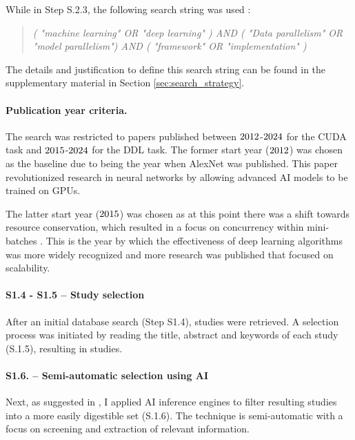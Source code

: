 While in Step S.2.3, the following search string was used :
\begin{quote}
	\textit{( "machine learning" OR "deep learning" )
		AND
		( "Data parallelism" OR "model parallelism")
		AND
		( "framework" OR "implementation" )}
\end{quote}

The details and justification to define this search string can be found in the supplementary
material in Section \ref{sec:search_strategy}.

\paragraph{Publication year criteria.}
The search was restricted to papers published between $2012$-$2024$ for the CUDA
task and $2015$-$2024$ for the DDL task. The former start year ($2012$)
was chosen as the baseline due to being the year when AlexNet \cite{krizhevsky_imagenet_2012} was
published. This paper revolutionized research in neural networks by allowing advanced AI models to
be trained on GPUs.

The latter start year ($2015$) was chosen as at this point there was a shift towards
resource conservation, which resulted in a focus on concurrency within mini-batches
\cite{ben-nun_demystifying_2020}. This is the year by which the effectiveness of deep learning
algorithms was more widely recognized and more research was published that focused on scalability.

\paragraph{S1.4 - S1.5 -- Study selection}
After an initial database search (Step S1.4),  studies were retrieved. A selection
process was initiated by reading the title, abstract and keywords of each study (S.1.5), resulting
in  studies.

\paragraph{S1.6. -- Semi-automatic selection using AI}
\label{sec:ai-screening}
Next, as suggested in \cite{brereton_lessons_2007-1}, I applied
AI inference engines to filter resulting studies into a more easily digestible set (S.1.6). The technique
is semi-automatic with a focus on screening and extraction of relevant information.

